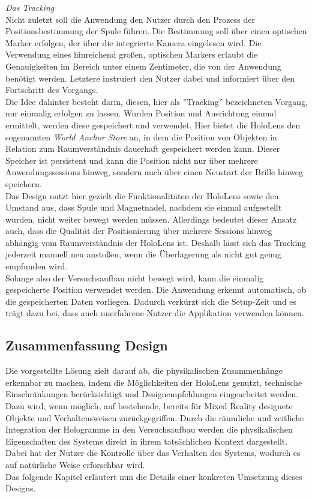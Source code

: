 \textit{Das Tracking}\\
Nicht zuletzt soll die Anwendung den Nutzer durch den Prozess der Positionsbestimmung der Spule führen. Die Bestimmung soll über einen optischen Marker erfolgen, der über die integrierte Kamera eingelesen wird. Die Verwendung eines hinreichend großen, optischen Markers erlaubt die Genauigkeiten im Bereich unter einem Zentimeter, die von der Anwendung benötigt werden. Letztere instruiert den Nutzer dabei und informiert über den Fortschritt des Vorgangs.\\

Die Idee dahinter besteht darin, diesen, hier als ''Tracking'' bezeichneten Vorgang, nur einmalig erfolgen zu lassen. Wurden Position und Ausrichtung einmal ermittelt, werden diese gespeichert und verwendet. Hier bietet die HoloLens den sogenannten \textit{World Anchor Store} an, in dem die Position von Objekten in Relation zum Raumverständnis dauerhaft gespeichert werden kann. Dieser Speicher ist persistent und kann die Position nicht nur über mehrere Anwendungssessions hinweg, sondern auch über einen Neustart der Brille hinweg speichern.\\ 

Das Design nutzt hier gezielt die Funktionalitäten der HoloLens sowie den Umstand aus, dass Spule und Magnetnadel, nachdem sie einmal aufgestellt wurden, nicht weiter bewegt werden müssen. Allerdings bedeutet dieser Ansatz auch, dass die Qualität der Positionierung über mehrere Sessions hinweg abhängig vom Raumverständnis der HoloLens ist. Deshalb lässt sich das Tracking jederzeit manuell neu anstoßen, wenn die Überlagerung als nicht gut genug empfunden wird.\\

Solange also der Versuchsaufbau nicht bewegt wird, kann die einmalig gespeicherte Position verwendet werden. Die Anwendung erkennt automatisch, ob die gespeicherten Daten vorliegen. Dadurch verkürzt sich die Setup-Zeit und es trägt dazu bei, dass auch unerfahrene Nutzer die Applikation verwenden können.




\subsection{Zusammenfassung Design}
\label{sec-4-5}
Die vorgestellte Lösung zielt darauf ab, die physikalischen Zusammenhänge erkennbar zu machen, indem die Möglichkeiten der HoloLens genutzt, technische Einschränkungen berücksichtigt und Designempfehlungen eingearbeitet werden. Dazu wird, wenn möglich, auf bestehende, bereits für Mixed Reality designete Objekte und Verhaltensweisen zurückgegriffen. Durch die räumliche und zeitliche Integration der Hologramme in den Versuchsaufbau werden die physikalischen Eigenschaften des Systems direkt in ihrem tatsächlichen Kontext dargestellt. Dabei hat der Nutzer die Kontrolle über das Verhalten des Systems, wodurch es auf natürliche Weise erforschbar wird.\\

Das folgende Kapitel erläutert nun die Details einer konkreten Umsetzung dieses Designs.

